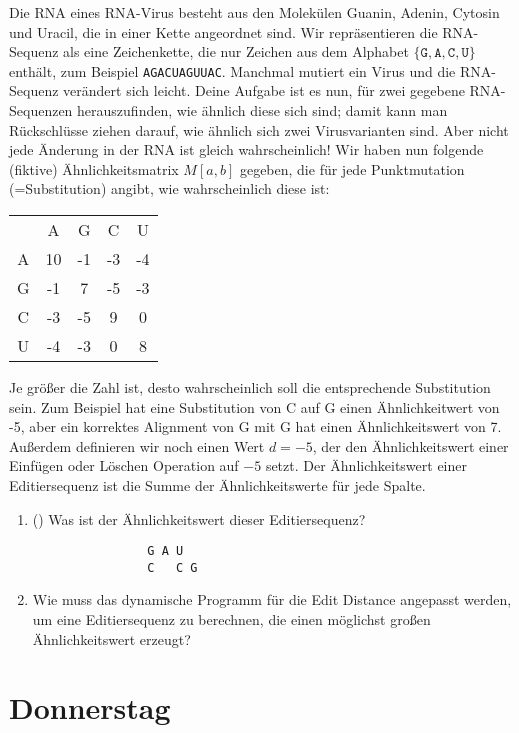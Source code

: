 \documentclass{uebung_cs}
\begin{document}
\begin{aufgabe}[RNA]
    Die RNA eines RNA-Virus besteht aus den Molekülen Guanin, Adenin, Cytosin und Uracil, die in einer Kette angeordnet sind. Wir repräsentieren die RNA-Sequenz als eine Zeichenkette, die nur Zeichen aus dem Alphabet $\{\texttt{G}, \texttt{A}, \texttt{C}, \texttt{U}\}$ enthält, zum Beispiel \verb|AGACUAGUUAC|.
        Manchmal mutiert ein Virus und die RNA-Sequenz verändert sich leicht. Deine Aufgabe ist es nun, für zwei gegebene RNA-Sequenzen herauszufinden, wie ähnlich diese sich sind; damit kann man Rückschlüsse ziehen darauf, wie ähnlich sich zwei Virusvarianten sind. Aber nicht jede Änderung in der RNA ist gleich wahrscheinlich! Wir haben nun folgende (fiktive) Ähnlichkeitsmatrix $M[a,b]$ gegeben, die für jede Punktmutation (=Substitution) angibt, wie wahrscheinlich diese ist:

        \begin{tabular}{ccccc}
             & A  & G &  C & U\\
           A & 10 &-1 & -3 & -4\\
           G & -1 & 7 & -5 & -3\\
           C & -3 &-5 &  9 &  0\\
           U & -4 &-3 &  0 &  8\\
        \end{tabular}

        Je größer die Zahl ist, desto wahrscheinlich soll die entsprechende Substitution sein.
        Zum Beispiel hat eine Substitution von C auf G einen Ähnlichkeitwert von -5, aber ein korrektes Alignment von G mit G hat einen Ähnlichkeitswert von 7.
        Außerdem definieren wir noch einen Wert $d=-5$, der den Ähnlichkeitswert einer Einfügen oder Löschen Operation auf $-5$ setzt.
        Der Ähnlichkeitswert einer Editiersequenz ist die Summe der Ähnlichkeitswerte für jede Spalte.
        \begin{enumerate}
            \item(\warmup) Was ist der Ähnlichkeitswert dieser Editiersequenz?
            \begin{verbatim}
                G A U  
                C   C G
            \end{verbatim}
            \item Wie muss das dynamische Programm für die Edit Distance angepasst werden, um eine Editiersequenz zu berechnen, die einen möglichst großen Ähnlichkeitswert erzeugt?
        \end{enumerate}
\end{aufgabe}
\section*{Donnerstag}
\begin{aufgabe}[test]
\end{aufgabe}
\end{document}
